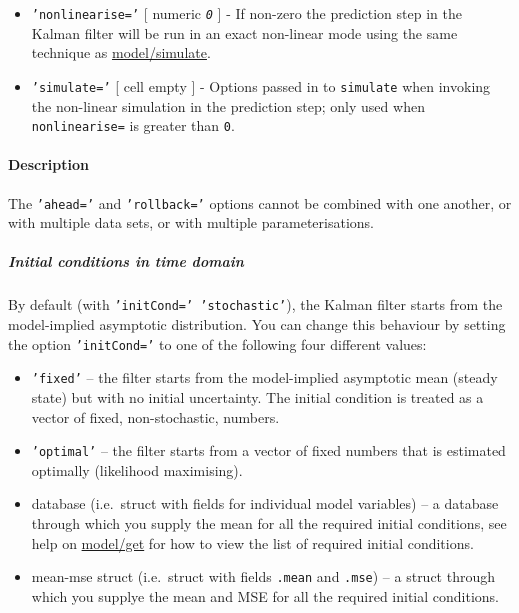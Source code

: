  \begin{itemize}
 \item
   \texttt{'nonlinearise='} {[} numeric \textbar{} \emph{\texttt{0}} {]}
   - If non-zero the prediction step in the Kalman filter will be run in
   an exact non-linear mode using the same technique as
   \url{model/simulate}.
 \item
   \texttt{'simulate='} {[} cell \textbar{} empty {]} - Options passed in
   to \texttt{simulate} when invoking the non-linear simulation in the
   prediction step; only used when \texttt{nonlinearise=} is greater than
   \texttt{0}.
 \end{itemize}
 
 \paragraph{Description}
 
 The \texttt{'ahead='} and \texttt{'rollback='} options cannot be
 combined with one another, or with multiple data sets, or with multiple
 parameterisations.
 
 \subparagraph{Initial conditions in time domain}
 
 By default (with \texttt{'initCond=' 'stochastic'}), the Kalman filter
 starts from the model-implied asymptotic distribution. You can change
 this behaviour by setting the option \texttt{'initCond='} to one of the
 following four different values:
 
 \begin{itemize}
 \item
   \texttt{'fixed'} -- the filter starts from the model-implied
   asymptotic mean (steady state) but with no initial uncertainty. The
   initial condition is treated as a vector of fixed, non-stochastic,
   numbers.
 \item
   \texttt{'optimal'} -- the filter starts from a vector of fixed numbers
   that is estimated optimally (likelihood maximising).
 \item
   database (i.e.~struct with fields for individual model variables) -- a
   database through which you supply the mean for all the required
   initial conditions, see help on \url{model/get} for how to view the
   list of required initial conditions.
 \item
   mean-mse struct (i.e.~struct with fields \texttt{.mean} and
   \texttt{.mse}) -- a struct through which you supplye the mean and MSE
   for all the required initial conditions.
 \end{itemize}
 
